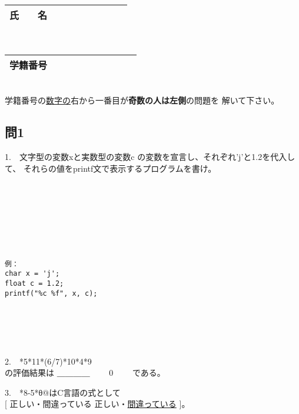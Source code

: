 \documentclass[a4j]{jarticle}
\def\ans#1#2{
\ifnum \anss=1
#1
\else
#2
\fi
}
\def\ds{\displaystyle}
\begin{document}
\thispagestyle{empty}

\begin{multicols*}{2}%


\def\subst#1#2{$\ds #1$
 \ $\longrightarrow$\ 
 \underline{\hbox to 5cm{\ttfamily #2}}}



\noindent
\begin{tabular}[t]{|c|cccccccc|}\hline
氏　　名 & & & & & & & & \\ \hline
\end{tabular}\\
\begin{tabular}[t]{|c|c|c|c|c|c|c|c|c|c|}\hline
学籍番号 & & & & & & & & \\ \hline
\end{tabular}\\
学籍番号の\underline{数字の}右から一番目が{\bfseries 奇数の人は左側}の問題を
解いて下さい。
\vspace{-5ex}



\subsection*{問1}


1.　文字型の変数{\ttfamily x}と実数型の変数{\ttfamily c}
の変数を宣言し、それぞれ{\ttfamily 'j'と1.2}を代入して、
それらの値を{\ttfamily printf}文で表示するプログラムを書け。


\ifnum {}
\begin{verbatim}








\end{verbatim}
\else
\begin{verbatim}
例：
char x = 'j';
float c = 1.2;
printf("%c %f", x, c);






\end{verbatim}
\fi



2.　{*5*11*(6/7)*10*4*9}\\
\hfill の評価結果は\ans{＿＿＿＿}{　　0　　}である。



3.　\verb@y*8-5*θ@はC言語の式として\\
\hfill[\ans{正しい・間違っている}{正しい・\underline{間違っている}}]。


\end{multicols*}
\end{document}
